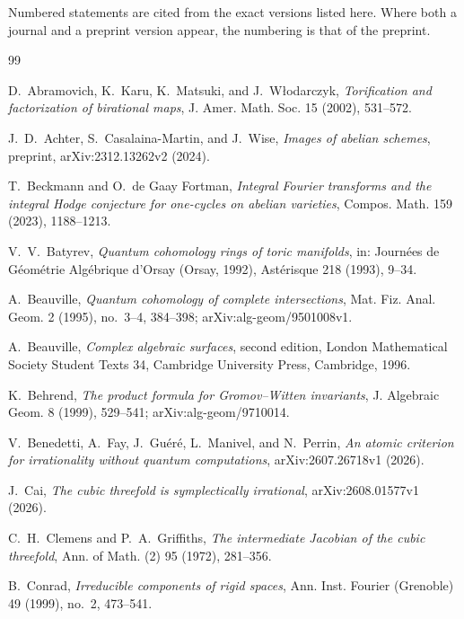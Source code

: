 \documentclass[11pt]{article}
\numberwithin{equation}{section}
\theoremstyle{definition}
\theoremstyle{remark}
\begin{document}
\footnotesize
\noindent Numbered statements are cited from the exact versions listed here.
Where both a journal and a preprint version appear, the numbering is that of
the preprint.

\begin{thebibliography}{99}


D.~Abramovich, K.~Karu, K.~Matsuki, and J.~W{\l}odarczyk,
\emph{Torification and factorization of birational maps},
J. Amer. Math. Soc. 15 (2002), 531--572.

\begingroup\raggedright
J.~D.~Achter, S.~Casalaina-Martin, and J.~Wise,
\emph{Images of abelian schemes},
preprint, arXiv:2312.13262v2 (2024).\par
\endgroup

T.~Beckmann and O.~de Gaay Fortman,
\emph{Integral Fourier transforms and the integral Hodge conjecture for
one-cycles on abelian varieties}, Compos. Math. 159 (2023), 1188--1213.

V.~V.~Batyrev,
\emph{Quantum cohomology rings of toric manifolds},
in: Journ\'ees de G\'eom\'etrie Alg\'ebrique d'Orsay (Orsay, 1992),
Ast\'erisque 218 (1993), 9--34.

A.~Beauville,
\emph{Quantum cohomology of complete intersections},
Mat. Fiz. Anal. Geom. 2 (1995), no.~3--4, 384--398;
arXiv:alg-geom/9501008v1.

A.~Beauville,
\emph{Complex algebraic surfaces}, second edition,
London Mathematical Society Student Texts 34,
Cambridge University Press, Cambridge, 1996.

K.~Behrend,
\emph{The product formula for Gromov--Witten invariants},
J. Algebraic Geom. 8 (1999), 529--541; arXiv:alg-geom/9710014.

V.~Benedetti, A.~Fay, J.~Gu\'er\'e, L.~Manivel, and N.~Perrin,
\emph{An atomic criterion for irrationality without quantum computations},
arXiv:2607.26718v1 (2026).

J.~Cai,
\emph{The cubic threefold is symplectically irrational},
arXiv:2608.01577v1 (2026).

C.~H.~Clemens and P.~A.~Griffiths,
\emph{The intermediate Jacobian of the cubic threefold},
Ann. of Math. (2) 95 (1972), 281--356.


B.~Conrad,
\emph{Irreducible components of rigid spaces},
Ann. Inst. Fourier (Grenoble) 49 (1999), no.~2, 473--541.


\end{thebibliography}
\end{document}
